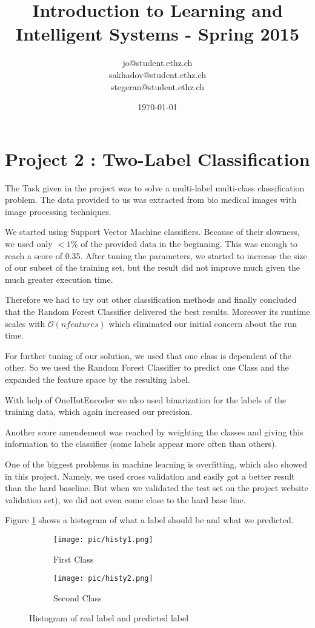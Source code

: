 \documentclass[a4paper, 11pt]{article}
\title{Introduction to Learning and Intelligent Systems - Spring 2015}
\author{jo@student.ethz.ch\\ sakhadov@student.ethz.ch\\  stegeran@student.ethz.ch\\}
\date{\today}
\begin{document}
\maketitle

\section*{Project 2 : Two-Label Classification}

The Task given in the project was to solve a multi-label multi-class classification problem. The data provided to us was extracted from bio medical images with image processing techniques.

We started using Support Vector Machine classifiers. Because of their slowness, we used only $<1$\% of the provided data in the beginning. This was enough to reach a score of 0.35. After tuning the parameters, we started to increase the size of our subset of the training set, but the result did not improve much given the much greater execution time.

Therefore we had to try out other classification methods and finally concluded that the Random Forest Classifier delivered the best results. Moreover its runtime scales with $\mathcal{O}(nfeatures)$ which eliminated our initial concern about the run time.

For further tuning of our solution, we used that one class is dependent of the other. So we used the Random Forest Classifier to predict one Class and the expanded the feature space by the resulting label. 

With help of OneHotEncoder we also used binarization for the labels of the training data, which again increased our precision.

Another score amendement was reached by weighting the classes and giving this information to the classifier (some labels appear more often than others).

One of the biggest problems in machine learning is overfitting, which also showed in this project. Namely, we used cross validation and easily got a better result than the hard baseline. But when we validated the test set on the project website validation set), we did not even come close to the hard base line.

Figure \ref{fig:hist} shows a histogram of what a label should be and what we predicted.

\begin{figure}[h]
 
\begin{subfigure}[l]{0.5\textwidth}
\texttt{[image: pic/histy1.png]} 
\caption{First Class}
\end{subfigure}
\begin{subfigure}[r]{0.5\textwidth}
\texttt{[image: pic/histy2.png]}
\caption{Second Class}
\end{subfigure}
 
\caption{Histogram of real label and predicted label}
\label{fig:hist}
\end{figure}
\end{document}
